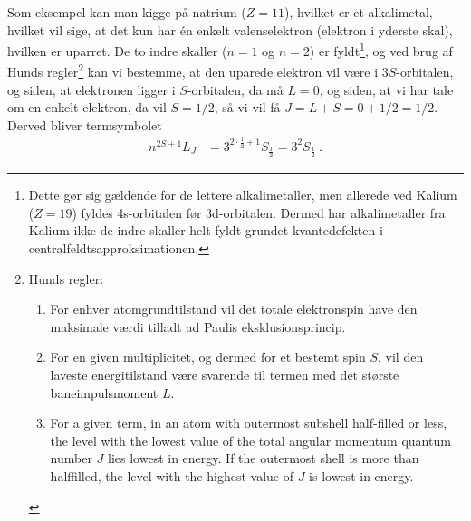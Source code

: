 Som eksempel kan man kigge på natrium ($Z=11$), hvilket er et alkalimetal, hvilket vil sige, at det kun har én enkelt valenselektron (elektron i yderste skal), hvilken er uparret. De to indre skaller ($n=1$ og $n=2$) er fyldt\footnote{Dette gør sig gældende for de lettere alkalimetaller, men allerede ved Kalium ($Z=19$) fyldes 4s-orbitalen før 3d-orbitalen. Dermed har alkalimetaller fra Kalium ikke de indre skaller helt fyldt grundet \textsf{kvantedefekten} i \textsf{centralfeldtsapproksimationen}.}, og ved brug af Hunds regler\footnote{Hunds regler:
\begin{enumerate}
    \item For enhver atomgrundtilstand vil det totale elektronspin have den maksimale værdi tilladt ad Paulis eksklusionsprincip.
    \item For en given multiplicitet, og dermed for et bestemt spin $S$, vil den laveste energitilstand være svarende til termen med det største baneimpulsmoment $L$.
    \item For a given term, in an atom with outermost subshell half-filled or less, the level with the lowest value of the total angular momentum quantum number $J$ lies lowest in energy. If the outermost shell is more than halffilled, the level with the highest value of $J$ is lowest in energy.
\end{enumerate}
} kan vi bestemme, at den uparede elektron vil være i $3S$-orbitalen, og siden, at elektronen ligger i $S$-orbitalen, da må $L = 0$, og siden, at vi har tale om en enkelt elektron, da vil $S = 1/2$, så vi vil få $J = L + S = 0 + 1/2 = 1/2$. Derved bliver termsymbolet
\begin{align}
    n^{2S+1}L_J &= 3^{2 \cdot \frac{1}{2} + 1}S_\frac{1}{2} = 3^2S_\frac{1}{2} \: .
\end{align}